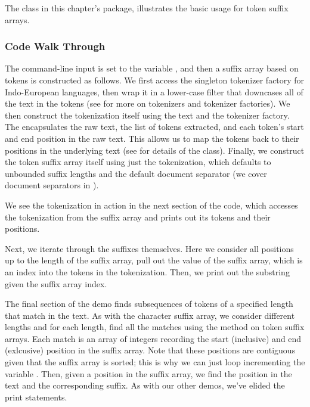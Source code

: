 The class  in this chapter's package,
 illustrates the basic usage
for token suffix arrays.  

\subsubsection{Code Walk Through}

The command-line input is set to the  variable
, and then a suffix array based on tokens is constructed as
follows.
%
%
We first access the singleton tokenizer factory for Indo-European
languages, then wrap it in a lower-case filter that downcases all of
the text in the tokens (see  for more on tokenizers
and tokenizer factories).  We then construct the tokenization itself
using the text and the tokenizer factory.  The 
encapsulates the raw text, the list of tokens extracted, and each
token's start and end position in the raw text.  This allows us to map
the tokens back to their positions in the underlying text (see
 for details of the
 class).  Finally, we construct the token suffix
array itself using just the tokenization, which defaults to unbounded
suffix lengths and the default document separator (we cover document
separators in ).

We see the tokenization in action in the next section of the code,
which accesses the tokenization from the suffix array and prints out
its tokens and their positions.
%

Next, we iterate through the suffixes themselves.
%
%
Here we consider all positions up to the length of the suffix
array, pull out the value of the suffix array, which is
an index into the tokens in the tokenization.  Then, we print out
the substring given the suffix array index.

The final section of the demo finds subsequences of tokens
of a specified length that match in the text.  
%
%
As with the character suffix array, we consider different lengths and
for each length, find all the matches using the 
method on token suffix arrays.  Each match is an array of integers
recording the start (inclusive) and end (exlcusive) position in the
suffix array.  Note that these positions are contiguous given that
the suffix array is sorted; this is why we can just loop incrementing
the variable .  Then, given a position in the suffix array,
we find the position in the text and the corresponding suffix.  As
with our other demos, we've elided the print statements.


